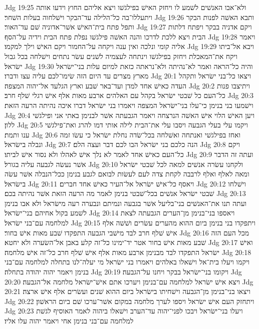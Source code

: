 Jdg 19:25  ולא־אבו האנשׁים לשׁמע לו ויחזק האישׁ בפילגשׁו ויצא אליהם החוץ וידעו אותה ויתעללו־בה כל־הלילה עד־הבקר וישׁלחוה בעלות השׁחר׃
Jdg 19:26  ותבא האשׁה לפנות הבקר ותפל פתח בית־האישׁ אשׁר־אדוניה שׁם עד־האור׃
Jdg 19:27  ויקם אדניה בבקר ויפתח דלתות הבית ויצא ללכת לדרכו והנה האשׁה פילגשׁו נפלת פתח הבית וידיה על־הסף׃
Jdg 19:28  ויאמר אליה קומי ונלכה ואין ענה ויקחה על־החמור ויקם האישׁ וילך למקמו׃
Jdg 19:29  ויבא אל־ביתו ויקח את־המאכלת ויחזק בפילגשׁו וינתחה לעצמיה לשׁנים עשׂר נתחים וישׁלחה בכל גבול ישׂראל׃
Jdg 19:30  והיה כל־הראה ואמר לא־נהיתה ולא־נראתה כזאת למיום עלות בני־ישׂראל מארץ מצרים עד היום הזה שׂימו־לכם עליה עצו ודברו׃
Jdg 20:1  ויצאו כל־בני ישׂראל ותקהל העדה כאישׁ אחד למדן ועד־באר שׁבע וארץ הגלעד אל־יהוה המצפה׃
Jdg 20:2  ויתיצבו פנות כל־העם כל שׁבטי ישׂראל בקהל עם האלהים ארבע מאות אלף אישׁ רגלי שׁלף חרב׃
Jdg 20:3  וישׁמעו בני בנימן כי־עלו בני־ישׂראל המצפה ויאמרו בני ישׂראל דברו איכה נהיתה הרעה הזאת׃
Jdg 20:4  ויען האישׁ הלוי אישׁ האשׁה הנרצחה ויאמר הגבעתה אשׁר לבנימן באתי אני ופילגשׁי ללון׃
Jdg 20:5  ויקמו עלי בעלי הגבעה ויסבו עלי את־הבית לילה אותי דמו להרג ואת־פילגשׁי ענו ותמת׃
Jdg 20:6  ואחז בפילגשׁי ואנתחה ואשׁלחה בכל־שׂדה נחלת ישׂראל כי עשׂו זמה ונבלה בישׂראל׃
Jdg 20:7  הנה כלכם בני ישׂראל הבו לכם דבר ועצה הלם׃
Jdg 20:8  ויקם כל־העם כאישׁ אחד לאמר לא נלך אישׁ לאהלו ולא נסור אישׁ לביתו׃
Jdg 20:9  ועתה זה הדבר אשׁר נעשׂה לגבעה עליה בגורל׃
Jdg 20:10  ולקחנו עשׂרה אנשׁים למאה לכל שׁבטי ישׂראל ומאה לאלף ואלף לרבבה לקחת צדה לעם לעשׂות לבואם לגבע בנימן ככל־הנבלה אשׁר עשׂה בישׂראל׃
Jdg 20:11  ויאסף כל־אישׁ ישׂראל אל־העיר כאישׁ אחד חברים׃
Jdg 20:12  וישׁלחו שׁבטי ישׂראל אנשׁים בכל־שׁבטי בנימן לאמר מה הרעה הזאת אשׁר נהיתה בכם׃
Jdg 20:13  ועתה תנו את־האנשׁים בני־בליעל אשׁר בגבעה ונמיתם ונבערה רעה מישׂראל ולא אבו בנימן לשׁמע בקול אחיהם בני־ישׂראל׃
Jdg 20:14  ויאספו בני־בנימן מן־הערים הגבעתה לצאת למלחמה עם־בני ישׂראל׃
Jdg 20:15  ויתפקדו בני בנימן ביום ההוא מהערים עשׂרים ושׁשׁה אלף אישׁ שׁלף חרב לבד מישׁבי הגבעה התפקדו שׁבע מאות אישׁ בחור׃
Jdg 20:16  מכל העם הזה שׁבע מאות אישׁ בחור אטר יד־ימינו כל־זה קלע באבן אל־השׂערה ולא יחטא׃
Jdg 20:17  ואישׁ ישׂראל התפקדו לבד מבנימן ארבע מאות אלף אישׁ שׁלף חרב כל־זה אישׁ מלחמה׃
Jdg 20:18  ויקמו ויעלו בית־אל וישׁאלו באלהים ויאמרו בני ישׂראל מי יעלה־לנו בתחלה למלחמה עם־בני בנימן ויאמר יהוה יהודה בתחלה׃
Jdg 20:19  ויקומו בני־ישׂראל בבקר ויחנו על־הגבעה׃
Jdg 20:20  ויצא אישׁ ישׂראל למלחמה עם־בנימן ויערכו אתם אישׁ־ישׂראל מלחמה אל־הגבעה׃
Jdg 20:21  ויצאו בני־בנימן מן־הגבעה וישׁחיתו בישׂראל ביום ההוא שׁנים ועשׂרים אלף אישׁ ארצה׃
Jdg 20:22  ויתחזק העם אישׁ ישׂראל ויספו לערך מלחמה במקום אשׁר־ערכו שׁם ביום הראשׁון׃
Jdg 20:23  ויעלו בני־ישׂראל ויבכו לפני־יהוה עד־הערב וישׁאלו ביהוה לאמר האוסיף לגשׁת למלחמה עם־בני בנימן אחי ויאמר יהוה עלו אליו׃
